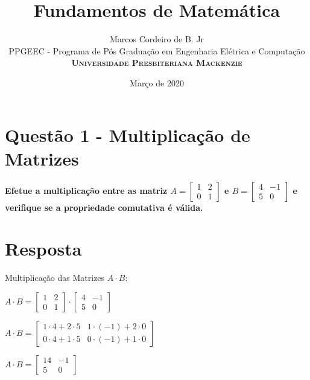 \documentclass[a4paper, 12pt]{article}
\title{Fundamentos de Matemática}
\author{Marcos Cordeiro de B. Jr\\ 
PPGEEC - Programa de Pós Graduação em Engenharia Elétrica e Computação\\
\textsc{\textbf{Universidade Presbiteriana Mackenzie}}
}
\date{Março de 2020}
\begin{document}
  
\setlength{\droptitle}{-5em}    
\maketitle

\section*{Questão 1 - Multiplicação de Matrizes}
  {\bfseries Efetue a multiplicação entre as matriz $A = 
  \begin{bmatrix}
    1 & 2 \\
    0 & 1
  \end{bmatrix}$ 
  e $B = 
  \begin{bmatrix}
    4 & -1 \\
    5 & 0
  \end{bmatrix}$ 
  e verifique se a propriedade comutativa é válida. }

  \section*{Resposta}
  Multiplicação das Matrizes $A \cdot B$:
  \begin{center}
    $A \cdot B = 
    \begin{bmatrix}
      1 & 2 \\
      0 & 1
    \end{bmatrix} 
    \cdot
    \begin{bmatrix}
      4 & -1 \\
      5 & 0
    \end{bmatrix}$

    $A \cdot B = 
    \begin{bmatrix}
      1 \cdot 4 + 2 \cdot 5 & 1 \cdot (-1) + 2 \cdot 0 \\
      0 \cdot 4 + 1 \cdot 5 & 0 \cdot (-1) + 1 \cdot 0 
    \end{bmatrix}$

    $A \cdot B = 
      \begin{bmatrix}
        14 & -1 \\
        5 & 0
      \end{bmatrix}$
  \end{center}
\end{document}
